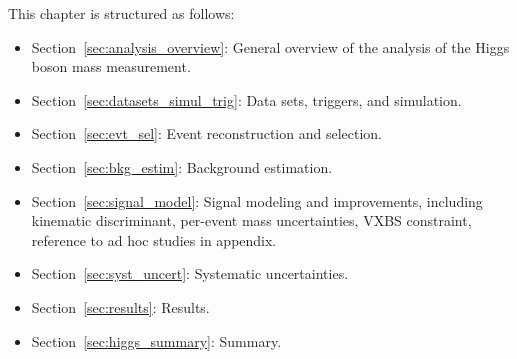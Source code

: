 This chapter is structured as follows:
\begin{itemize}                                                                          
    \item Section~\ref{sec:analysis_overview}: General overview of the analysis of the Higgs boson mass measurement.
    \item Section~\ref{sec:datasets_simul_trig}: Data sets, triggers, and simulation.
    \item Section~\ref{sec:evt_sel}: Event reconstruction and selection.
    \item Section~\ref{sec:bkg_estim}: Background estimation.
    \item Section~\ref{sec:signal_model}: Signal modeling and improvements, including kinematic discriminant, per-event mass uncertainties, VXBS constraint, reference to ad hoc studies in appendix.
    \item Section~\ref{sec:syst_uncert}: Systematic uncertainties.
    \item Section~\ref{sec:results}: Results.
    \item Section~\ref{sec:higgs_summary}: Summary.
\end{itemize}
